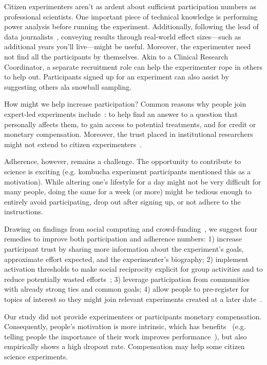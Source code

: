 Citizen experimenters aren't as ardent about sufficient participation numbers as professional scientists. One important piece of technical knowledge is performing power analysis before running the experiment. Additionally, following the lead of data journalists~\cite{Gray2012}, conveying results through real-world effect sizes---such as additional years you'll live---might be useful. Moreover, the experimenter need not find all the participants by themselves. Akin to a Clinical Research Coordinator, a separate recruitment role can help the experimenter rope in others to help out. Participants signed up for an experiment can also assist by suggesting others ala snowball sampling.

How might we help increase participation? Common reasons why people join expert-led experiments include~\cite{NIH2015}: to help find an answer to a question that personally affects them, to gain access to potential treatments, and for credit or monetary compensation. Moreover, the trust placed in institutional researchers might not extend to citizen experimenters~\cite{Cooper2014}. 

Adherence, however, remains a challenge. The opportunity to contribute to science is exciting (e.g. kombucha experiment participants mentioned this as a motivation). While altering one's lifestyle for a day might not be very difficult for many people, doing the same for a week (or more) might be tedious enough to entirely avoid participating, drop out after signing up, or not adhere to the instructions.

Drawing on findings from social computing and crowd-funding~\cite{hui2014understanding, Karkar2017a }, we suggest four remedies to improve both participation and adherence numbers: 1) increase participant trust by sharing more information about the experiment's goals, approximate effort expected, and the experimenter's biography; 2) implement activation thresholds to make social reciprocity explicit for group activities and to reduce potentially wasted efforts~\cite{cheng2014catalyst}; 3) leverage participation from communities with already strong ties and common goals; 4) allow people to pre-register for topics of interest so they might join relevant experiments created at a later date~\cite{bernstein2011crowds}.

Our study did not provide experimenters or participants monetary compensation. Consequently, people's motivation is more intrinsic, which has benefits~\cite{NationalCouncilforVoluntaryOrganisations2018} (e.g. telling people the importance of their work improves performance~\cite{Chandler2013}), but also empirically shows a high dropout rate. Compensation may help some citizen science experiments. 

